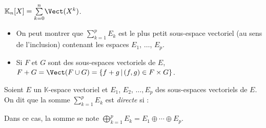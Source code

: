 \documentclass[french,11pt,twoside]{VcCours}
\newcommand{\Sum}[2]{\ensuremath{\textstyle{\sum\limits_{#1}^{#2}}}}
\begin{document}
\begin{Demonstration}{}

\vspace{6cm}


\end{Demonstration}

\begin{Exemple} $\mathbb{K}_n[X] = \Sum{k=0}{n} \Vect(X^k)$.
\end{Exemple}

\begin{Remarques}{}
\begin{itemize} 
\item On peut montrer que $\Sum{k=1}{p} E_k$ est le plus petit sous-espace vectoriel (au sens de l'inclusion) contenant les espaces $E_1$, $\ldots$, $E_p$. 
\item Si $F$ et $G$ sont des sous-espaces vectoriels de $E$, $F+G = \Vect(F \cup G) = \lbrace f+g \, \vert \, (f,g) \in F \times G\rbrace$.
\end{itemize}
\end{Remarques}{}

\begin{Definition}{} 
Soient $E$ un $\mathbb{K}$-espace vectoriel et $E_1$, $E_2$, $\ldots, E_p$ des sous-espaces vectoriels de $E$. On dit que la somme $\Sum{k=1}{p} E_k$ est \emph{directe} si :

\vspace{1cm}
%
Dans ce cas, la somme se note $\bigoplus_{k=1}^p E_k = E_1 \oplus \cdots \oplus E_p$.
\end{Definition}
\end{document}
